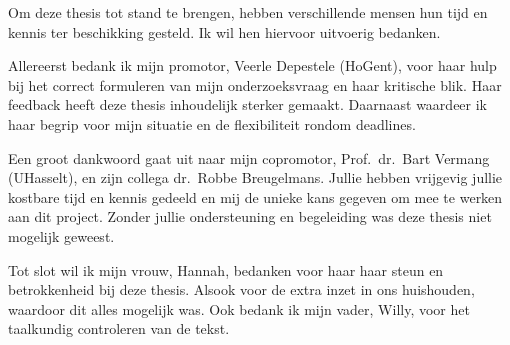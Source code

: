 Om deze thesis tot stand te brengen, hebben verschillende mensen hun tijd en kennis ter beschikking gesteld. Ik wil hen hiervoor uitvoerig bedanken.\medskip

Allereerst bedank ik mijn promotor, Veerle Depestele (HoGent), voor haar hulp bij het correct formuleren van mijn onderzoeksvraag en haar kritische blik. Haar feedback heeft deze thesis inhoudelijk sterker gemaakt. Daarnaast waardeer ik haar begrip voor mijn situatie en de flexibiliteit rondom deadlines.\medskip

Een groot dankwoord gaat uit naar mijn copromotor, Prof.\ dr.\ Bart Vermang (UHasselt), en zijn collega dr.\ Robbe Breugelmans. Jullie hebben vrijgevig jullie kostbare tijd en kennis gedeeld en mij de unieke kans gegeven om mee te werken aan dit project. Zonder jullie ondersteuning en begeleiding was deze thesis niet mogelijk geweest.\medskip

Tot slot wil ik mijn vrouw, Hannah, bedanken voor haar haar steun en betrokkenheid bij deze thesis. Alsook voor de extra inzet in ons huishouden, waardoor dit alles mogelijk was. Ook bedank ik mijn vader, Willy, voor het taalkundig controleren van de tekst.\medskip
